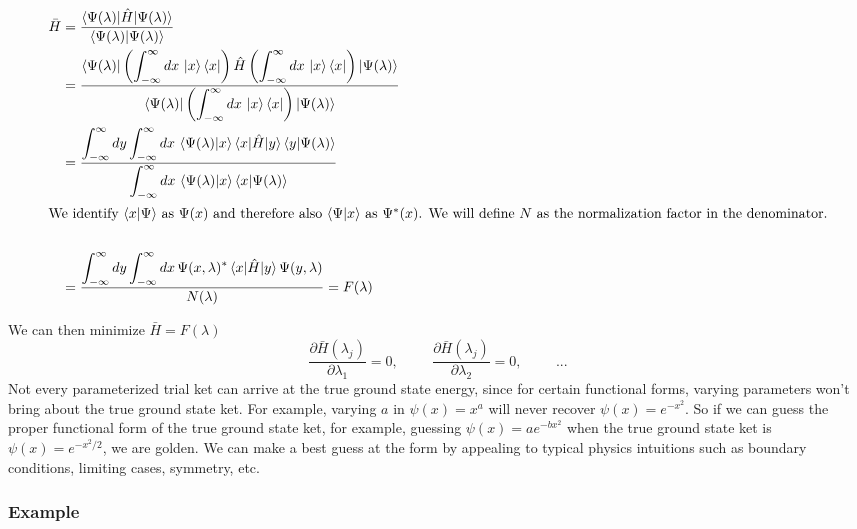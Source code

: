 \documentclass[12pt]{article}
\begin{document}
\begin{align*}
    \bar{H} &= \frac{\braket{\Psi(\lambda) | \hat{H} | \Psi(\lambda)}}{\braket{\Psi(\lambda) | \Psi(\lambda)}}\\
    &= \frac{\displaystyle \bra{\Psi(\lambda)} \left(\int_{-\infty}^{\infty}dx \, \ket{x}\bra{x}\right) \hat{H} \left(\int_{-\infty}^{\infty}dx \, \ket{x}\bra{x}\right)\ket{\Psi(\lambda)}}{\displaystyle \bra{\Psi(\lambda)} \left(\int_{-\infty}^{\infty}dx \, \ket{x}\bra{x}\right) \ket{\Psi(\lambda)}}\\
    &= \frac{\displaystyle \int_{-\infty}^{\infty} dy \int_{-\infty}^{\infty} dx \, \braket{\Psi(\lambda) | x}\braket{x | \hat{H} | y} \braket{y | \Psi(\lambda)}}{\displaystyle \int_{-\infty}^{\infty} dx \, \braket{\Psi(\lambda) | x}\braket{x | \Psi(\lambda)}}\\
    \intertext{We identify $\braket{x | \Psi}$ as $\Psi(x)$ and therefore also $\braket{\Psi| x}$ as $\Psi^*(x)$. We will define $N$ as the normalization factor in the denominator.}\\
    &= \frac{\displaystyle \int_{-\infty}^{\infty} dy \int_{-\infty}^{\infty} dx \, \Psi(x, \lambda)^* \braket{x | \hat{H} | y} \Psi(y, \lambda)}{N(\lambda)} = F(\lambda)
\end{align*}

We can then minimize $\bar{H} = F(\lambda)$
\begin{equation*}
    \frac{\partial{\bar{H}(\lambda_j)}}{\partial{\lambda_1}} = 0, \hspace{1cm}\frac{\partial{\bar{H}(\lambda_j)}}{\partial{\lambda_2}} = 0, \hspace{1cm}...
\end{equation*}
Not every parameterized trial ket can arrive at the true ground state energy, since for certain functional forms, varying parameters won't bring about the true ground state ket. For example, varying $a$ in $\psi(x) = x^a$ will never recover $\psi(x) = e^{-x^2}$. So if we can guess the proper functional form of the true ground state ket, for example, guessing $\psi(x) = ae^{-bx^2}$ when the true ground state ket is $\psi(x) = e^{-x^2/2}$, we are golden. We can make a best guess at the form by appealing to typical physics intuitions such as boundary conditions, limiting cases, symmetry, etc.

\subsubsection{Example}
\end{document}

